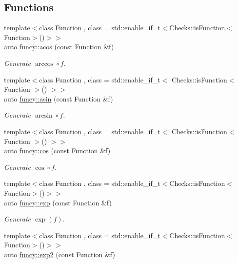 \subsection*{Functions}
\begin{DoxyCompactItemize}
\item 
{\footnotesize template$<$class Function , class  = std\-::enable\-\_\-if\-\_\-t$<$\-Checks\-::is\-Function$<$\-Function$>$()$>$$>$ }\\auto \hyperlink{group__CMathGroup_ga440738f86b6ddd1e240a21e8712ebc55}{funcy\-::acos} (const Function \&f)
\begin{DoxyCompactList}\small\item\em Generate $ \arccos\circ f $. \end{DoxyCompactList}\item 
{\footnotesize template$<$class Function , class  = std\-::enable\-\_\-if\-\_\-t$<$ Checks\-::is\-Function$<$ Function $>$() $>$$>$ }\\auto \hyperlink{group__CMathGroup_ga9829bc8e5bcafdb397fb518f960545d8}{funcy\-::asin} (const Function \&f)
\begin{DoxyCompactList}\small\item\em Generate $ \arcsin\circ f $. \end{DoxyCompactList}\item 
{\footnotesize template$<$class Function , class  = std\-::enable\-\_\-if\-\_\-t$<$ Checks\-::is\-Function$<$ Function $>$() $>$$>$ }\\auto \hyperlink{group__CMathGroup_gaa9d6107852e7d6202c34f09bdbfaf8a2}{funcy\-::cos} (const Function \&f)
\begin{DoxyCompactList}\small\item\em Generate $ \cos\circ f $. \end{DoxyCompactList}\item 
{\footnotesize template$<$class Function , class  = std\-::enable\-\_\-if\-\_\-t$<$\-Checks\-::is\-Function$<$\-Function$>$()$>$$>$ }\\auto \hyperlink{group__CMathGroup_gaadc968931c4efe760c812f6b871a97f5}{funcy\-::exp} (const Function \&f)
\begin{DoxyCompactList}\small\item\em Generate $ \exp(f) $. \end{DoxyCompactList}\item 
{\footnotesize template$<$class Function , class  = std\-::enable\-\_\-if\-\_\-t$<$\-Checks\-::is\-Function$<$\-Function$>$()$>$$>$ }\\auto \hyperlink{group__CMathGroup_gac880c86664b1237622566adea8f808a0}{funcy\-::exp2} (const Function \&f)

\end{DoxyCompactItemize}
